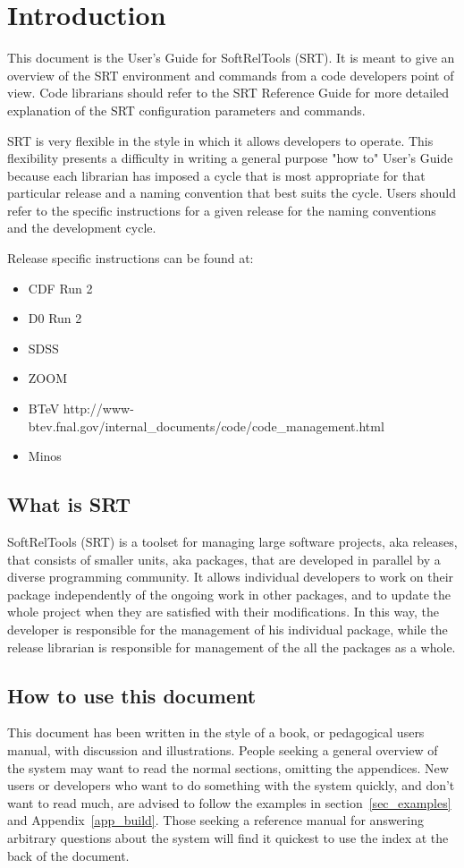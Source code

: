 \documentclass[12pt]{article}
\begin{document}
\clearpage
\section{Introduction}

This document is the User's Guide for SoftRelTools (SRT). It is meant
to give an overview of the SRT environment and commands
from a code developers point
of view. Code librarians should refer to the SRT Reference Guide for
more detailed explanation of the SRT configuration parameters and commands. 

SRT is very flexible in the style in which it allows developers to operate. 
This flexibility presents a difficulty in writing a general purpose "how to"
User's Guide because each librarian has imposed a cycle that is most 
appropriate for that particular release and a naming convention that
best suits the cycle. Users should refer to the specific instructions 
for a given release for the naming conventions and the development cycle. 

Release specific instructions can be found at:
\begin{itemize}
\item CDF Run 2
\item D0 Run 2
\item SDSS
\item ZOOM
\item BTeV http://www-btev.fnal.gov/internal\_documents/code/code\_management.html
\item Minos 
\end{itemize}

\subsection{What is SRT}

SoftRelTools (SRT) is a toolset for managing large software projects, aka releases,
that consists of smaller units, aka packages, that are developed in parallel
by a diverse programming community. It allows individual developers to 
work on their package independently of the ongoing work in other packages,
and to update the whole project when they are satisfied with their 
modifications. In this way, the developer is responsible for the management
of his individual package, while the release librarian is responsible for 
management of the all the packages as a whole.


\subsection{How to use this document}
This document has been written in the style of a book, or pedagogical users
manual, with discussion and illustrations.  People seeking a general 
overview of the system may want to read the normal sections, omitting the 
appendices.  New users or developers who want to do something with the system 
quickly, and don't want to read much, are advised to follow the examples in 
section~\ref{sec_examples} and Appendix~\ref{app_build}. Those seeking a 
reference manual for answering arbitrary questions about the system will find
it quickest to use the index at the back of the document.  
\end{document}
